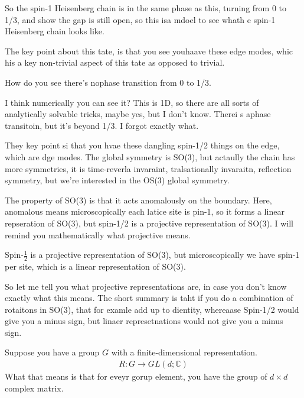 So the spin-1 Heisenberg chain is in the same phase as this,
turning from 0 to 1/3,
and show the gap is still open,
so this isa mdoel to see whath e spin-1 Heisenberg chain looks like.

The key point about this tate,
is that you see youhaave these edge modes,
whic his a key non-trivial aspect of this tate as opposed to trivial.

\begin{question}
    How do you see there's nophase transition from 0 to 1/3.
\end{question}
I think numerically you can see it?
This is 1D,
so there are all sorts of analytically solvable tricks,
maybe yes,
but I don't know.
Therei s aphase transitoin,
but it's beyond 1/3.
I forgot exactly what.

They key point si that you hvae these dangling spin-1/2 things on the edge,
which are dge modes.
The global symmetry is SO(3),
but actaully the chain has more symmetries,
it is time-reverla invaraint,
tralsationally invaraitn,
reflection symmetry,
but we're interested in the OS(3) global symmetry.

The property of SO(3) is that it acts anomalously on the boundary.
Here, anomalous means microscopically each latice site is pin-1,
so it forms a linear repseration of SO(3),
but spin-1/2 is a projective representation of SO(3).
I will remind you mathematically what projective means.

Spin-$\frac{1}{2}$ is a projective representation of SO(3),
but microscopically we have spin-1 per site,
which is a linear representation of SO(3).

So let me tell you what projective representations are,
in case you don't know exactly what this means.
The short summary is taht if you do a combination of rotaitons in SO(3),
that for examle add up to dientity,
whereaase Spin-1/2 would give you a minus sign,
but linaer represetnations would not give you a minus sign.

Suppose you have a group $G$ with a finite-dimensional representation.
\begin{align}
    R: G \to GL(d; \mathbb{C})
\end{align}
What that means is that for eveyr gorup element,
you have the group of $d\times d$ complex matrix.

